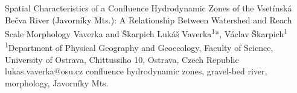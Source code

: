 \abstract
{Spatial Characteristics of a Confluence Hydrodynamic Zones of the Vsetínská Bečva River (Javorníky Mts.): A Relationship Between Watershed and Reach Scale Morphology} 
{Vaverka and Škarpich} 
{Lukáš Vaverka\textsuperscript{1}*, Václav Škarpich\textsuperscript{1}} 
{\TLtag} 
{
	\textsuperscript{1}Department of Physical Geography and Geoecology, Faculty of Science, University of Ostrava, Chittussiho 10, Ostrava, Czech Republic
}
{lukas.vaverka@osu.cz}  %
{confluence hydrodynamic zones, gravel-bed river, morphology, Javorníky Mts.}

